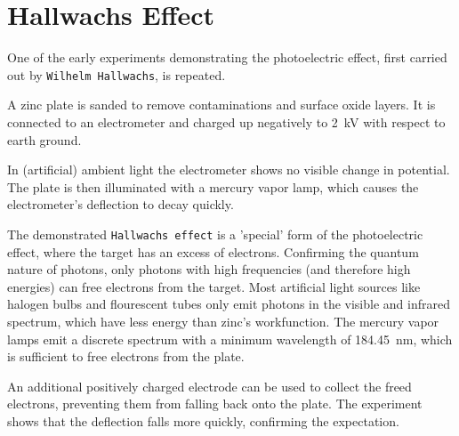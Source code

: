 \chapter{Hallwachs Effect}

One of the early experiments demonstrating the photoelectric effect, first carried out by \texttt{Wilhelm Hallwachs}, is repeated.

A zinc plate is sanded to remove contaminations and surface oxide layers.
It is connected to an electrometer and charged up negatively to \SI{2}{\kV} with respect to earth ground.

In (artificial) ambient light the electrometer shows no visible change in potential.
The plate is then illuminated with a mercury vapor lamp, which causes the electrometer's deflection to decay quickly.

The demonstrated \texttt{Hallwachs effect} is a 'special' form of the photoelectric effect, where the target has an excess of electrons.
Confirming the quantum nature of photons, only photons with high frequencies (and therefore high energies) can free electrons from the target.
Most artificial light sources like halogen bulbs and flourescent tubes only emit photons in the visible and infrared spectrum, which have less energy than zinc's workfunction.
The mercury vapor lamps emit a discrete spectrum with a minimum wavelength of \SI{184.45}{\nm}, which is sufficient to free electrons from the plate.

An additional positively charged electrode can be used to collect the freed electrons, preventing them from falling back onto the plate.
The experiment shows that the deflection falls more quickly, confirming the expectation.
